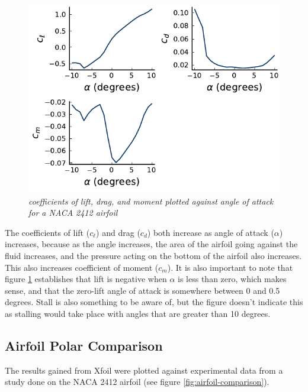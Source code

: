 \documentclass{journal}
\begin{document}
	\begin{figure}
		\centering
		\includegraphics{../graphics/aoa-coefficients.pdf}
		\caption{\emph{coefficients of lift, drag, and moment plotted against angle of attack for a NACA 2412 airfoil}}
		\label{fig:aoa-coefficients}
	\end{figure}
	
	The coefficients of lift (\(c_\ell\)) and drag (\(c_d\)) both increase as angle of attack (\(\alpha\)) increases, because as the angle increases, the area of the airfoil going against the fluid increases, and the pressure acting on the bottom of the airfoil also increases. This also increases coefficient of moment (\(c_m\)). It is also important to note that figure \ref{fig:aoa-coefficients} establishes that lift is negative when \(\alpha\) is less than zero, which makes sense, and that the zero-lift angle of attack is somewhere between 0 and 0.5 degrees. Stall is also something to be aware of, but the figure doesn't indicate this as stalling would take place with angles that are greater than 10 degrees.
	
	\subsection{Airfoil Polar Comparison}
	The results gained from Xfoil were plotted against experimental data from a study done on the NACA 2412 airfoil (see figure \ref{fig:airfoil-comparison}).
	
\end{document}
